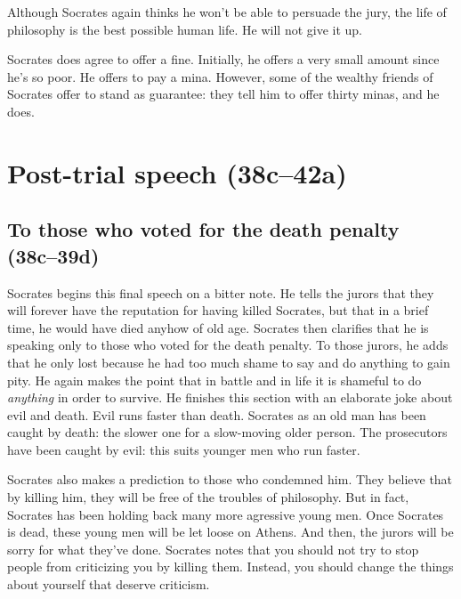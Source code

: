 \documentclass[11pt]{article}
\begin{document}
Although Socrates again thinks he won't be able to persuade the jury, the life of philosophy is the best possible human life.  He will not give it up.

Socrates does agree to offer a fine.  Initially, he offers a very small amount since he's so poor.  He offers to pay a mina.  However, some of the wealthy friends of Socrates offer to stand as guarantee: they tell him to offer thirty minas, and he does.


\section{Post-trial speech (38c--42a)}

\subsection{To those who voted for the death penalty (38c--39d)}

Socrates begins this final speech on a bitter note.  He tells the jurors that they will forever have the reputation for having killed Socrates, but that in a brief time, he would have died anyhow of old age.  Socrates then clarifies that he is speaking only to those who voted for the death penalty.  To those jurors, he adds that he only lost because he had too much shame to say and do anything to gain pity.  He again makes the point that in battle and in life it is shameful to do \emph{anything} in order to survive.  He finishes this section with an elaborate joke about evil and death. Evil runs faster than death.  Socrates as an old man has been caught by death: the slower one for a slow-moving older person.  The prosecutors have been caught by evil: this suits younger men who run faster.

Socrates also makes a prediction to those who condemned him.  They believe that by killing him, they will be free of the troubles of philosophy.  But in fact, Socrates has been holding back many more agressive young men.  Once Socrates is dead, these young men will be let loose on Athens.  And then, the jurors will be sorry for what they've done.  Socrates notes that you should not try to stop people from criticizing you by killing them.  Instead, you should change the things about yourself that deserve criticism.

\end{document}
